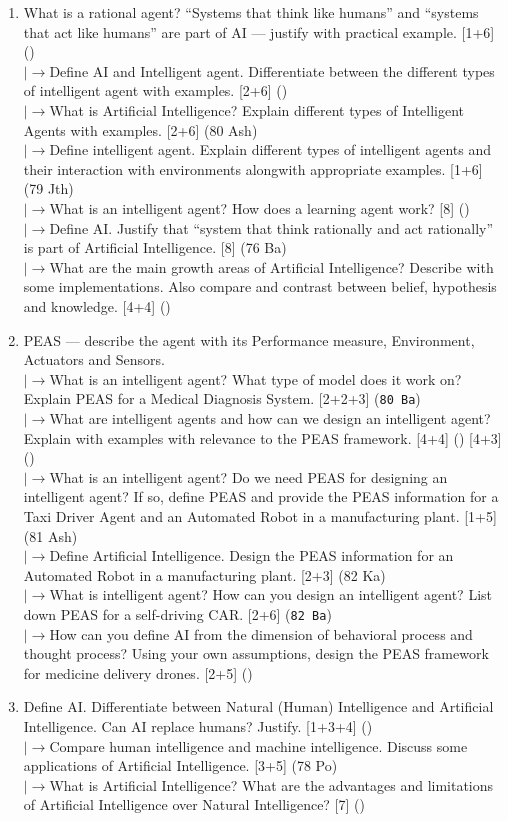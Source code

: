 \documentclass[12pt]{article}
\newcommand{\lb}{\\$\left|\rightarrow\right.$}
\begin{document}
\begin{enumerate}[topsep=0pt, noitemsep]
      \item What is a rational agent? ``Systems that think like humans'' and ``systems that act like humans'' are part of AI --- justify with practical example. \hfill [1+6] ()
        \lb Define AI and Intelligent agent. Differentiate between the different types of intelligent agent with examples. \hfill [2+6] ()
        \lb What is Artificial Intelligence? Explain different types of Intelligent Agents with examples. \hfill [2+6] (80 Ash)
        \lb Define intelligent agent. Explain different types of intelligent agents and their interaction with environments alongwith appropriate examples. \hfill [1+6] (79 Jth)
        \lb What is an intelligent agent? How does a learning agent work? \hfill [8] ()
        \lb Define AI. Justify that ``system that think rationally and act rationally'' is part of Artificial Intelligence. \hfill [8] (76 Ba)
        \lb What are the main growth areas of Artificial Intelligence? Describe with some implementations. Also compare and contrast between belief, hypothesis and knowledge. \hfill [4+4] ()

      \item PEAS --- describe the agent with its Performance measure, Environment, Actuators and Sensors.
        \lb What is an intelligent agent? What type of model does it work on? Explain PEAS for a Medical Diagnosis System. \hfill [2+2+3] (\texttt{80 Ba})
        \lb What are intelligent agents and how can we design an intelligent agent? Explain with examples with relevance to the PEAS framework. \hfill [4+4] () [4+3] ()
        \lb What is an intelligent agent? Do we need PEAS for designing an intelligent agent? If so, define PEAS and provide the PEAS information for a Taxi Driver Agent and an Automated Robot in a manufacturing plant. \hfill [1+5] (81 Ash)
        \lb Define Artificial Intelligence. Design the PEAS information for an Automated Robot in a manufacturing plant. \hfill [2+3] (82 Ka)
        \lb What is intelligent agent? How can you design an intelligent agent? List down PEAS for a self-driving CAR. \hfill [2+6] (\texttt{82 Ba})
        \lb How can you define AI from the dimension of behavioral process and thought process? Using your own assumptions, design the PEAS framework for medicine delivery drones. \hfill [2+5] ()

      \item Define AI. Differentiate between Natural (Human) Intelligence and Artificial Intelligence. Can AI replace humans? Justify. \hfill [1+3+4] ()
        \lb Compare human intelligence and machine intelligence. Discuss some applications of Artificial Intelligence. \hfill [3+5] (78 Po)
        \lb What is Artificial Intelligence? What are the advantages and limitations of Artificial Intelligence over Natural Intelligence? \hfill [7] ()
    \end{enumerate}
\end{document}
